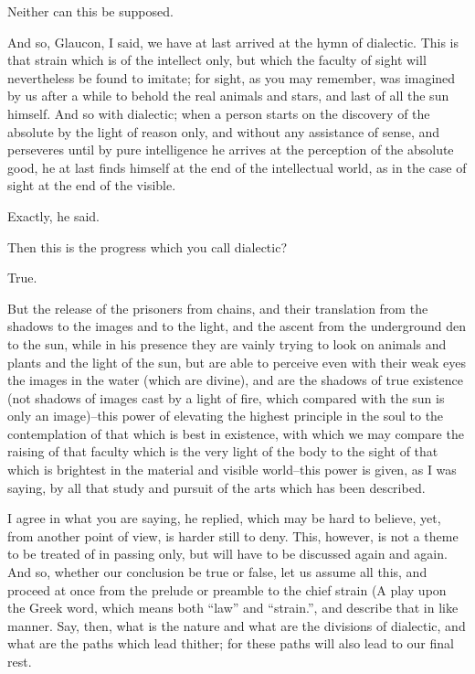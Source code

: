 Neither can this be supposed.

And so, Glaucon, I said, we have at last arrived at the hymn of
dialectic. This is that strain which is of the intellect only, but which
the faculty of sight will nevertheless be found to imitate; for sight,
as you may remember, was imagined by us after a while to behold the
real animals and stars, and last of all the sun himself. And so with
dialectic; when a person starts on the discovery of the absolute by
the light of reason only, and without any assistance of sense, and
perseveres until by pure intelligence he arrives at the perception
of the absolute good, he at last finds himself at the end of the
intellectual world, as in the case of sight at the end of the visible.

Exactly, he said.

Then this is the progress which you call dialectic?

True.

But the release of the prisoners from chains, and their translation
from the shadows to the images and to the light, and the ascent from the
underground den to the sun, while in his presence they are vainly trying
to look on animals and plants and the light of the sun, but are able to
perceive even with their weak eyes the images in the water (which are
divine), and are the shadows of true existence (not shadows of images
cast by a light of fire, which compared with the sun is only an
image)--this power of elevating the highest principle in the soul to
the contemplation of that which is best in existence, with which we may
compare the raising of that faculty which is the very light of the body
to the sight of that which is brightest in the material and visible
world--this power is given, as I was saying, by all that study and
pursuit of the arts which has been described.

I agree in what you are saying, he replied, which may be hard to
believe, yet, from another point of view, is harder still to deny. This,
however, is not a theme to be treated of in passing only, but will have
to be discussed again and again. And so, whether our conclusion be true
or false, let us assume all this, and proceed at once from the prelude
or preamble to the chief strain (A play upon the Greek word, which means
both ``law'' and ``strain.'', and describe that in like manner. Say, then,
what is the nature and what are the divisions of dialectic, and what
are the paths which lead thither; for these paths will also lead to our
final rest.

